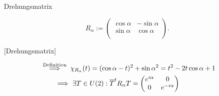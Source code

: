 \documentclass[class=article, crop=false]{standalone}
\begin{document}
\begin{zettel}{Drehungsmatrix}
\begin{flashcard}[]{}
	\begin{definition}
		\[
			R_{\alpha} :=
			\begin{pmatrix}
				\cos \alpha & -  \sin \alpha \\
				\sin \alpha & \cos \alpha    \\
			\end{pmatrix}
		.\]
	\end{definition}[Drehungsmatrix]
\end{flashcard}

\begin{remark}
	\begin{align*}
		\stackrel{\tx{ Definition } }{\implies} & \chi_{R_{\alpha}}(t) = ( \cos \alpha - t)^2 + \sin \alpha^2 = t^2 - 2t \cos \alpha +1 \\
		\implies                                & \exists T \in  U(2) : \bar{T}^t R_{\alpha} T =
		\begin{pmatrix}
			e^{i\alpha} & 0            \\
			0           & e^{-i\alpha} \\
		\end{pmatrix}
	\end{align*}
\end{remark}
\end{zettel}
\end{document}
